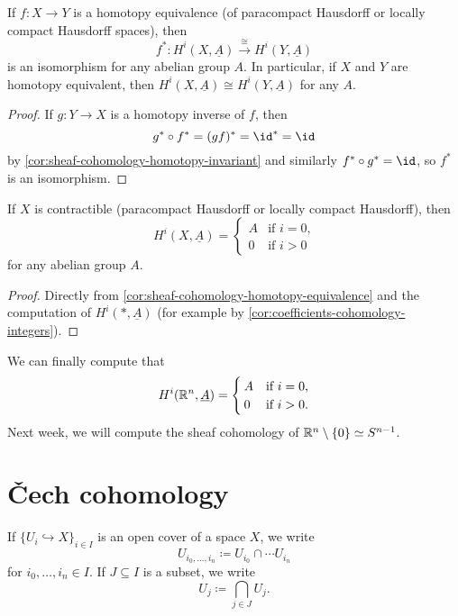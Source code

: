 \begin{cor}\label{cor:sheaf-cohomology-homotopy-equivalence}
If \(f\colon X\to Y\) is a homotopy equivalence (of paracompact Hausdorff or locally compact Hausdorff spaces), then
\[ f^*\colon H^i(X,\underline{A})\xrightarrow{\cong} H^i(Y,\underline{A}) \]
is an isomorphism for any abelian group \(A\).
In particular, if \(X\) and \(Y\) are homotopy equivalent, then \(H^i(X,\underline{A})\cong H^i(Y,\underline{A})\) for any \(A\).
\end{cor}
\begin{proof}
If \(g\colon Y\to X\) is a homotopy inverse of \(f\), then
\[ g^*\circ f^* = (gf)^* = \id^* = \id \]
by \cref{cor:sheaf-cohomology-homotopy-invariant} and similarly \(f^*\circ g^*=\id\), so \(f^*\) is an isomorphism.
\end{proof}

\begin{cor}
If \(X\) is contractible (paracompact Hausdorff or locally compact Hausdorff), then
\[ H^i(X,\underline{A}) =
  \begin{cases}
    A & \text{if } i = 0\text{,} \\
    0 & \text{if } i > 0
  \end{cases}
\]
for any abelian group \(A\).
\end{cor}
\begin{proof}
Directly from \cref{cor:sheaf-cohomology-homotopy-equivalence} and the computation of \(H^i(*,\underline{A})\) (for example by \cref{cor:coefficients-cohomology-integers}).
\end{proof}

\begin{exmp}
We can finally compute that
\[ H^i(\mathbb{R}^n,\underline{A}) =
  \begin{cases}
    A & \text{if } i = 0\text{,} \\
    0 & \text{if } i > 0\text{.}
  \end{cases}
\]
Next week, we will compute the sheaf cohomology of \(\bb R^n\setminus\{0\}\simeq\sphere[n-1]\).
\end{exmp}

\section{Čech cohomology}

\begin{notn}
If \(\{U_i\hookrightarrow X\}_{i\in I}\) is an open cover of a space \(X\), we write
\[ U_{i_0,\ldots,i_n} \coloneq U_{i_0} \cap \cdots U_{i_n} \]
for \(i_0,\ldots,i_n\in I\).
If \(J\subseteq I\) is a subset, we write
\[ U_j \coloneq \bigcap_{j\in J}U_j\text{.} \]
\end{notn}

